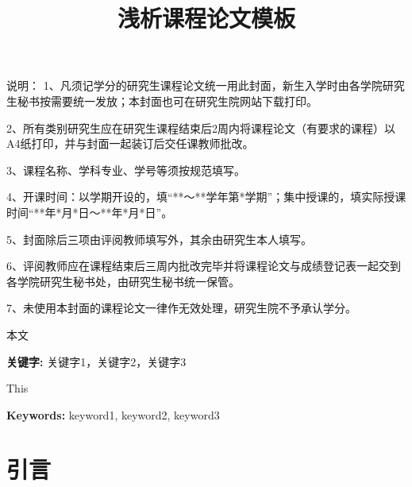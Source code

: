 \documentclass[12pt,hyperref,a4paper,UTF8]{ctexart}
\begin{document}
\cover
\thispagestyle{empty} %

\newpage
{说明：
1、凡须记学分的研究生课程论文统一用此封面，新生入学时由各学院研究生秘书按需要统一发放；本封面也可在研究生院网站下载打印。


2、所有类别研究生应在研究生课程结束后2周内将课程论文（有要求的课程）以A4纸打印，并与封面一起装订后交任课教师批改。


3、课程名称、学科专业、学号等须按规范填写。


4、开课时间：以学期开设的，填“**～**学年第*学期”；集中授课的，填实际授课时间“**年*月*日～**年*月*日”。


5、封面除后三项由评阅教师填写外，其余由研究生本人填写。


6、评阅教师应在课程结束后三周内批改完毕并将课程论文与成绩登记表一起交到各学院研究生秘书处，由研究生秘书统一保管。


7、未使用本封面的课程论文一律作无效处理，研究生院不予承认学分。
}
\thispagestyle{empty} %

\newpage
\setcounter{page}{1}
\begin{center}
    \title{ \Huge \textbf{{浅析课程论文模板}}}
\end{center}
\maketitle
\thispagestyle{plain} 
\begin{cnabstract}
本文
\par \noindent \textbf{关键字: } 关键字1，关键字2，关键字3
\end{cnabstract}
\vspace{2em}
\begin{enabstract}
This
\par \noindent \textbf{Keywords:} keyword1, keyword2, keyword3
\end{enabstract}

\clearpage
\tableofcontents

\newpage
\section{引言}
\end{document}
